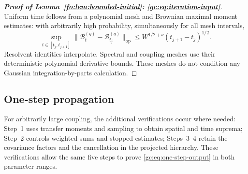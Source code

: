 \documentclass[11pt]{article}
\numberwithin{equation}{section}
\theoremstyle{remark}
\newcommand{\op}{\mathrm{op}}
\begin{document}
\begin{proof}[\textbf{Proof of Lemma~\ref{fo:lem:bounded-initial}: \eqref{gc:eq:iteration-input}}]
Uniform time follows from a polynomial mesh and Brownian maximal
moment estimates: with arbitrarily high probability, simultaneously
for all mesh intervals,
\[
 \sup_{t\in[t_j,t_{j+1}]}
 \|\mathcal B_t^{(g)}-\mathcal B_{t_j}^{(g)}\|_\op
 \le W^{1/2+\nu}(t_{j+1}-t_j)^{1/2}.
\]
Resolvent identities interpolate. Spectral and coupling meshes use
their deterministic polynomial derivative bounds. These meshes
do not condition any Gaussian integration-by-parts calculation.
\end{proof}


\subsection{One-step propagation}\label{sec:gc-one-step}

For arbitrarily large coupling, the additional verifications occur where
needed: Step~1 uses transfer moments and sampling to obtain spatial and
time suprema; Step~2 controls weighted sums and stopped estimates;
Steps~3--4 retain the covariance factors and the cancellation in the
projected hierarchy. These verifications allow the same five steps to
prove \eqref{gc:eq:one-step-output} in both parameter ranges.
\end{document}
